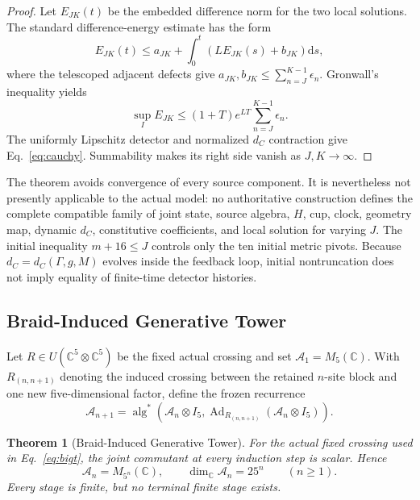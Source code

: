 \documentclass[11pt]{article}
\newtheorem{theorem}{Theorem}[section]
\theoremstyle{definition}
\theoremstyle{remark}
\newcommand{\cA}{\mathcal{A}}
\newcommand{\dd}{\mathrm{d}}
\begin{document}
\begin{proof}
Let $E_{JK}(t)$ be the embedded difference norm for the two local solutions. The standard difference-energy estimate has the form
\begin{equation}
 E_{JK}(t)\le a_{JK}+\int_0^t\left(LE_{JK}(s)+b_{JK}\right)\dd s,
\end{equation}
where the telescoped adjacent defects give
$a_{JK},b_{JK}\le\sum_{n=J}^{K-1}\epsilon_n$.
Gronwall's inequality yields
\begin{equation}
 \sup_I E_{JK}\le(1+T)e^{LT}\sum_{n=J}^{K-1}\epsilon_n.
\end{equation}
The uniformly Lipschitz detector and normalized $d_C$ contraction give Eq.~\eqref{eq:cauchy}. Summability makes its right side vanish as $J,K\to\infty$.
\end{proof}

The theorem avoids convergence of every source component. It is nevertheless not presently applicable to the actual model: no authoritative construction defines the complete compatible family of joint state, source algebra, $H$, cup, clock, geometry map, dynamic $d_C$, constitutive coefficients, and local solution for varying $J$. The initial inequality $m+16\le J$ controls only the ten initial metric pivots. Because $d_C=d_C(\Gamma,g,M)$ evolves inside the feedback loop, initial nontruncation does not imply equality of finite-time detector histories.

\subsection{Braid-Induced Generative Tower}

Let $R\in U(\mathbb C^5\otimes\mathbb C^5)$ be the fixed actual crossing and set $\cA_1=M_5(\mathbb C)$. With $R_{(n,n+1)}$ denoting the induced crossing between the retained $n$-site block and one new five-dimensional factor, define the frozen recurrence
\begin{equation}\label{eq:bigt}
 \cA_{n+1}=\operatorname{alg}^{*}\!\left(
 \cA_n\otimes I_5,
 \operatorname{Ad}_{R_{(n,n+1)}}(\cA_n\otimes I_5)
 \right).
\end{equation}

\begin{theorem}[Braid-Induced Generative Tower]\label{thm:bigt}
For the actual fixed crossing used in Eq.~\eqref{eq:bigt}, the joint commutant at every induction step is scalar. Hence
\begin{equation}
 \cA_n=M_{5^n}(\mathbb C),
 \qquad \dim_{\mathbb C}\cA_n=25^n
 \qquad(n\ge1).
\end{equation}
Every stage is finite, but no terminal finite stage exists.
\end{theorem}
\end{document}
